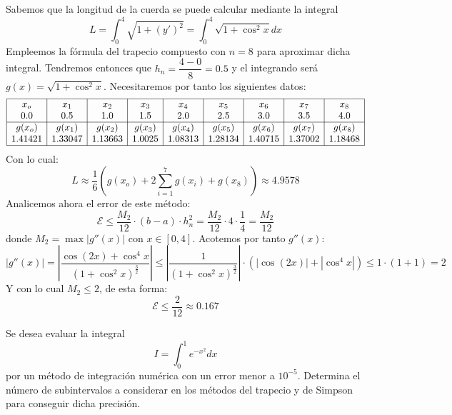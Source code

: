 \begin{sol}
Sabemos que la longitud de la cuerda se puede calcular mediante la integral
$$L=\int_0^4\sqrt{1+(y')^2}=\int_0^4\sqrt{1+\cos^2x}dx$$
Empleemos la fórmula del trapecio compuesto con $n=8$ para aproximar dicha integral. Tendremos entonces que $h_n=\dfrac{4-0}{8}=0.5$ y el integrando será $g(x)=\sqrt{1+\cos^2x}$. Necesitaremos por tanto los siguientes datos:
$$\begin{array}{|c|c|c|c|c|c|c|c|c|}
    \hline
     x_o&x_1&x_2&x_3&x_4&x_5&x_6&x_7&x_8  \\
     0.0&0.5&1.0&1.5&2.0&2.5&3.0&3.5&4.0 \\
     \hline
     g(x_o)&g(x_1)&g(x_2)&g(x_3)&g(x_4)&g(x_5)&g(x_6)&g(x_7)&g(x_8)\\
     1.41421&1.33047&1.13663&1.0025&1.08313&1.28134&1.40715&1.37002&1.18468\\
     \hline
\end{array}$$
Con lo cual:
$$L\approx \dfrac{1}{6}\left(g(x_o)+2\sum_{i=1}^7g(x_i)+g(x_8)\right)\approx 4.9578$$
Analicemos ahora el error de este método:
$$\mathcal{E}\leq \dfrac{M_2}{12}\cdot (b-a)\cdot h_n^2=\dfrac{M_2}{12}\cdot 4\cdot\dfrac{1}{4}=\dfrac{M_2}{12}$$
donde $M_2=\max|g''(x)|$ con $x\in[0,4]$. Acotemos por tanto $g''(x)$:
$$|g''(x)|=\left|\dfrac{\cos(2x)+\cos^4x}{(1+\cos^2x)^{\frac{3}{2}}}\right|\leq \left|\dfrac{1}{(1+\cos^2x)^{\frac{3}{2}}}\right| \cdot (|\cos(2x)|+|\cos^4x|)\leq 1\cdot (1+1)=2 $$
Y con lo cual $M_2\leq 2$, de esta forma:
$$\mathcal{E}\leq\dfrac{2}{12}\approx 0.167$$
\end{sol}
\begin{ejer}
Se desea evaluar la integral
$$I=\int_0^1e^{-x^2}dx$$
por un método de integración numérica con un error menor a $10^{-5}$. Determina el número de subintervalos a considerar en los métodos del trapecio y de Simpson para conseguir dicha precisión.
\end{ejer}
